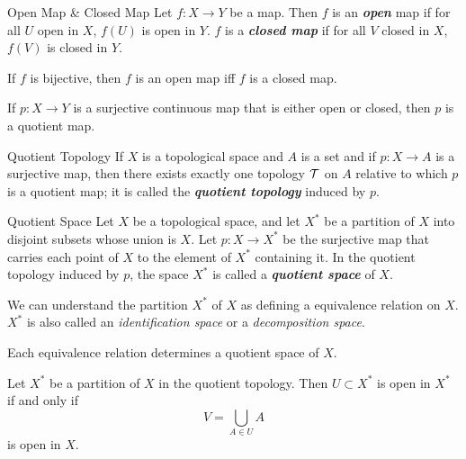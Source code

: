 \documentclass[12pt,a4paper]{article}
\begin{document}
    \begin{defi}{Open Map \& Closed Map}
        Let $f:X\to Y$ be a map. Then $f$ is an \textbf{\textit{open}} map if for all $U$ open in $X$, $f(U)$ is open in $Y$. $f$ is a \textbf{\textit{closed map}} if for all $V$ closed in $X$, $f(V)$ is closed in $Y$. 
    \end{defi}
    \begin{remark}
        If $f$ is bijective, then $f$ is an open map iff $f$ is a closed map.  
    \end{remark}
    \begin{remark}
        If $p:X\to Y$ is a surjective continuous map that is either open or closed, then $p$ is a quotient map.
    \end{remark}
    \hfill

    \begin{defi}{Quotient Topology}
        If $X$ is a topological space and $A$ is a set and if $p:X\to A$ is a surjective map, then there exists exactly one topology $\mathcal{T}$ on $A$ relative to which $p$ is a quotient map; it is called the \textbf{\textit{quotient topology}} induced by $p$.
    \end{defi}
    \hfill

    \begin{defi}{Quotient Space}
        Let $X$ be a topological space, and let $X^*$ be a partition of $X$ into disjoint subsets whose union is $X$. Let $p:X\to X^*$ be the surjective map that carries each point of $X$ to the element of $X^*$ containing it. In the quotient topology induced by $p$, the space $X^*$ is called a \textbf{\textit{quotient space}} of $X$.
    \end{defi}
    \begin{remark}
        We can understand the partition $X^*$ of $X$ as defining a equivalence relation on $X$. $X^*$ is also called an \textit{identification space} or a \textit{decomposition space}.
    \end{remark}
    \begin{remark}
        Each equivalence relation determines a quotient space of $X$.
    \end{remark}
    \begin{remark}
        Let $X^*$ be a partition of $X$ in the quotient topology. Then $U\subset X^*$ is open in $X^*$ if and only if
        $$
        V=\bigcup_{A\in U}A
        $$
        is open in $X$.
    \end{remark}
    \hfill
\end{document}
